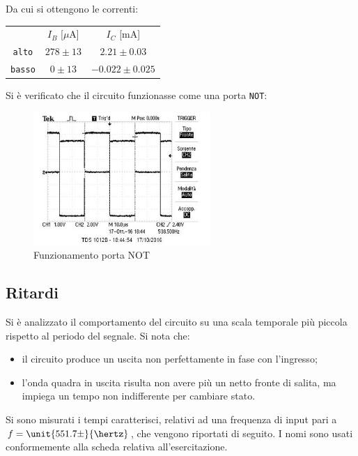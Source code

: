 \documentclass[10pt,a4paper]{article}
\def\code#1{\texttt{#1}}
\begin{document}
Da cui si ottengono le correnti:
\begin{table}[h!]
\centering
\begin{tabular}{c|c|c}
 & $I_B$ [$\mu$A]& $I_C$ [mA]\\
\code{alto} & $278 \pm 13$ & $2.21 \pm 0.03$\\
\code{basso} & $0 \pm 13 $ & $-0.022 \pm 0.025$
\end{tabular}
\end{table}

Si è verificato che il circuito funzionasse come una porta \code{NOT}:

\begin{figure}[h!]
	\centering
	\includegraphics[width=0.6\textwidth]{../oscilloscopio/not_tarocco.jpg}
	\caption{Funzionamento porta NOT}
\end{figure}

\subsection{Ritardi}
Si è analizzato il comportamento del circuito su una scala temporale più piccola rispetto al periodo del segnale. Si nota che:
\begin{itemize}
\item il circuito produce un uscita non perfettamente in fase con l'ingresso;
\item l'onda quadra in uscita risulta non avere più un netto fronte di salita, ma impiega un tempo non indifferente per cambiare stato.
\end{itemize}

Si sono misurati i tempi caratterisci, relativi ad una frequenza di input pari a $f = \unit{551.7 \pm}{\hertz}$, che vengono riportati di seguito. I nomi sono usati conformemente alla scheda relativa all'esercitazione. 
\end{document}
